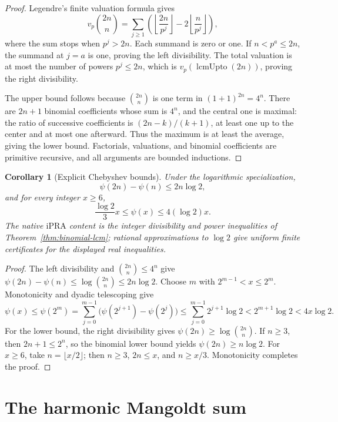 \documentclass[11pt]{article}
\newtheorem{corollary}[theorem]{Corollary}
\theoremstyle{definition}
\newcommand{\ipra}{\mathrm{iPRA}}
\newcommand{\lcmu}{\operatorname{lcmUpto}}
\begin{document}
\begin{proof}
Legendre's finite valuation formula gives
\[
 v_p\!\binom{2n}{n}
 =\sum_{j\ge1}
 \left(\left\lfloor\frac{2n}{p^j}\right\rfloor
      -2\left\lfloor\frac n{p^j}\right\rfloor\right),
\]
where the sum stops when \(p^j>2n\).  Each summand is zero or one.  If
\(n<p^a\le2n\), the summand at \(j=a\) is one, proving the left divisibility.
The total valuation is at most the number of powers \(p^j\le2n\), which is
\(v_p(\lcmu(2n))\), proving the right divisibility.

The upper bound follows because \(\binom{2n}{n}\) is one term in
\((1+1)^{2n}=4^n\).  There are \(2n+1\) binomial coefficients whose sum is
\(4^n\), and the central one is maximal: the ratio of successive coefficients
is \((2n-k)/(k+1)\), at least one up to the center and at most one afterward.
Thus the maximum is at least the average, giving the lower bound.  Factorials,
valuations, and binomial coefficients are primitive recursive, and all
arguments are bounded inductions.
\end{proof}

\begin{corollary}[Explicit Chebyshev bounds]\label{cor:chebyshev-bounds}
Under the logarithmic specialization,
\[
 \psi(2n)-\psi(n)\le2n\log2,
\]
and for every integer \(x\ge6\),
\[
 \boxed{\frac{\log2}{3}x\le\psi(x)\le4(\log2)x.}
\]
The native \(\ipra\) content is the integer divisibility and power inequalities
of Theorem~\ref{thm:binomial-lcm}; rational approximations to \(\log2\) give
uniform finite certificates for the displayed real inequalities.
\end{corollary}

\begin{proof}
The left divisibility and \(\binom{2n}{n}\le4^n\) give
\(
 \psi(2n)-\psi(n)\le\log\binom{2n}{n}\le2n\log2.
\)
Choose \(m\) with \(2^{m-1}<x\le2^m\).  Monotonicity and dyadic telescoping
give
\[
 \psi(x)\le\psi(2^m)
 =\sum_{j=0}^{m-1}\bigl(\psi(2^{j+1})-\psi(2^j)\bigr)
 \le\sum_{j=0}^{m-1}2^{j+1}\log2
 <2^{m+1}\log2<4x\log2.
\]
For the lower bound, the right divisibility gives
\(\psi(2n)\ge\log\binom{2n}{n}\).  If \(n\ge3\), then
\(2n+1\le2^n\), so the binomial lower bound yields
\(\psi(2n)\ge n\log2\).  For \(x\ge6\), take
\(n=\lfloor x/2\rfloor\); then \(n\ge3\), \(2n\le x\), and
\(n\ge x/3\).  Monotonicity completes the proof.
\end{proof}

\section{The harmonic Mangoldt sum}
\end{document}

